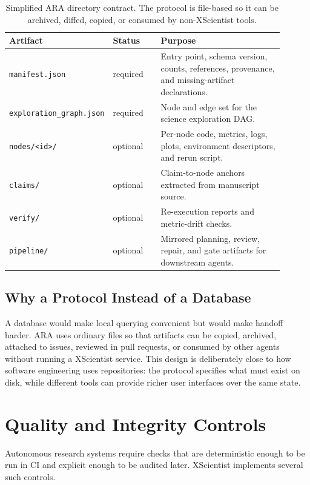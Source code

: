 \documentclass[11pt]{article}
\begin{document}
\begin{table}[t]
\centering
\small
\begin{tabular}{p{0.23\linewidth}p{0.18\linewidth}p{0.49\linewidth}}
\toprule
Artifact & Status & Purpose \\
\midrule
\texttt{manifest.json} & required & Entry point, schema version, counts,
references, provenance, and missing-artifact declarations. \\
\texttt{exploration\_}\linebreak\texttt{graph.json} & required & Node and edge set for the
science exploration DAG. \\
\texttt{nodes/<id>/} & optional & Per-node code, metrics, logs, plots,
environment descriptors, and rerun script. \\
\texttt{claims/} & optional & Claim-to-node anchors extracted from manuscript
source. \\
\texttt{verify/} & optional & Re-execution reports and metric-drift checks. \\
\texttt{pipeline/} & optional & Mirrored planning, review, repair, and gate
artifacts for downstream agents. \\
\bottomrule
\end{tabular}
\normalsize
\caption{Simplified ARA directory contract. The protocol is file-based so it
can be archived, diffed, copied, or consumed by non-XScientist tools.}
\label{tab:ara-contract}
\end{table}

\subsection{Why a Protocol Instead of a Database}

A database would make local querying convenient but would make handoff harder.
ARA uses ordinary files so that artifacts can be copied, archived, attached to
issues, reviewed in pull requests, or consumed by other agents without running
a XScientist service. This design is deliberately close to how software
engineering uses repositories: the protocol specifies what must exist on
disk, while different tools can provide richer user interfaces over the same
state.

\section{Quality and Integrity Controls}

Autonomous research systems require checks that are deterministic enough to
be run in CI and explicit enough to be audited later. XScientist implements
several such controls.
\end{document}
